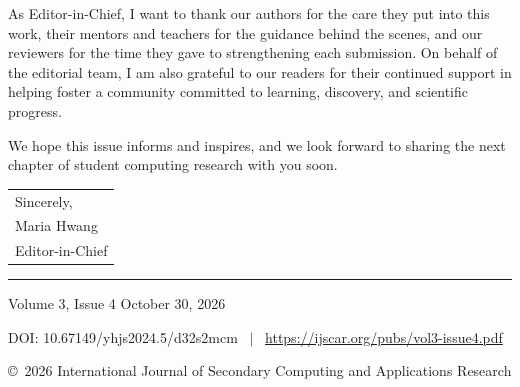 \documentclass[10pt,letterpaper]{article}
\begin{document}
As Editor-in-Chief, I want to thank our authors for the care they put into this work, their mentors and teachers for the guidance behind the scenes, and our reviewers for the time they gave to strengthening each submission. On behalf of the editorial team, I am also grateful to our readers for their continued support in helping foster a community committed to learning, discovery, and scientific progress.

We hope this issue informs and inspires, and we look forward to sharing the next chapter of student computing research with you soon.

\vspace{1ex}
\begin{tabular}[t]{@{}l@{}}
Sincerely,\\
Maria Hwang\\
Editor-in-Chief
\end{tabular}

\vfill
\hrule\vspace{1.2ex}
Volume 3, Issue 4 \hfill October 30, 2026\par
DOI: 10.67149/yhjs2024.5/d32s2mcm \ $|$ \ \url{https://ijscar.org/pubs/vol3-issue4.pdf}\par
\copyright\ 2026 International Journal of Secondary Computing and Applications Research
\end{document}

